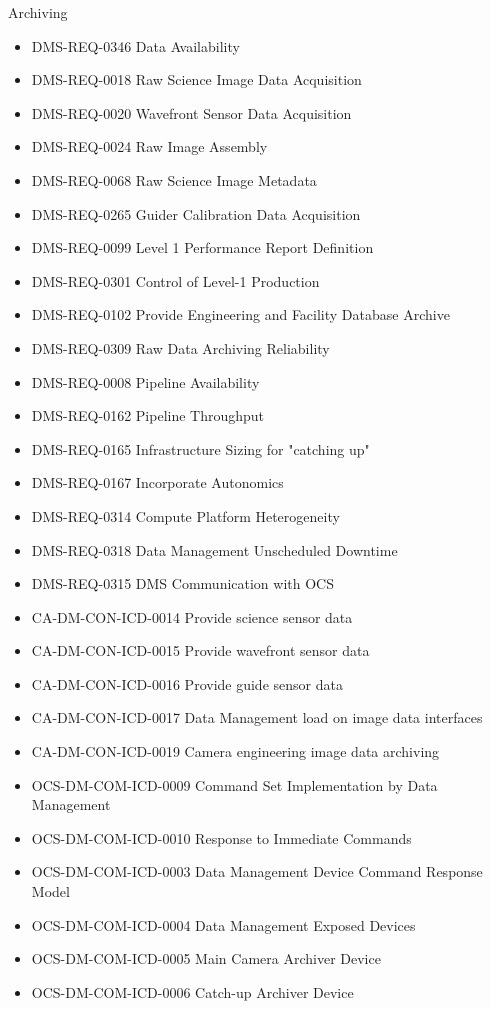 Archiving \begin{itemize}
\item DMS-REQ-0346 Data Availability
\item DMS-REQ-0018 Raw Science Image Data Acquisition
\item DMS-REQ-0020 Wavefront Sensor Data Acquisition
\item DMS-REQ-0024 Raw Image Assembly
\item DMS-REQ-0068 Raw Science Image Metadata
\item DMS-REQ-0265 Guider Calibration Data Acquisition
\item DMS-REQ-0099 Level 1 Performance Report Definition
\item DMS-REQ-0301 Control of Level-1 Production
\item DMS-REQ-0102 Provide Engineering and Facility Database Archive
\item DMS-REQ-0309 Raw Data Archiving Reliability
\item DMS-REQ-0008 Pipeline Availability
\item DMS-REQ-0162 Pipeline Throughput
\item DMS-REQ-0165 Infrastructure Sizing for "catching up"
\item DMS-REQ-0167 Incorporate Autonomics
\item DMS-REQ-0314 Compute Platform Heterogeneity
\item DMS-REQ-0318 Data Management Unscheduled Downtime
\item DMS-REQ-0315 DMS Communication with OCS
\item CA-DM-CON-ICD-0014 Provide science sensor data
\item CA-DM-CON-ICD-0015 Provide wavefront sensor data
\item CA-DM-CON-ICD-0016 Provide guide sensor data
\item CA-DM-CON-ICD-0017 Data Management load on image data interfaces
\item CA-DM-CON-ICD-0019 Camera engineering image data archiving
\item OCS-DM-COM-ICD-0009 Command Set Implementation by Data Management
\item OCS-DM-COM-ICD-0010 Response to Immediate Commands
\item OCS-DM-COM-ICD-0003 Data Management Device Command Response Model
\item OCS-DM-COM-ICD-0004 Data Management Exposed Devices
\item OCS-DM-COM-ICD-0005 Main Camera Archiver Device
\item OCS-DM-COM-ICD-0006 Catch-up Archiver Device

\end{itemize}
